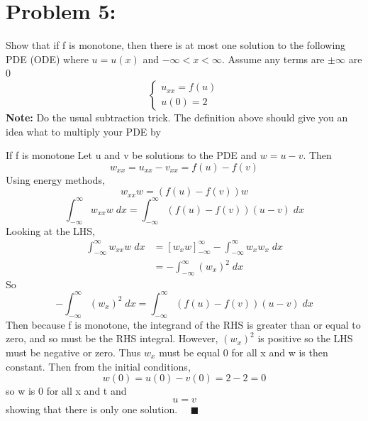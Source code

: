 \documentclass[12pt]{article}
\begin{document}
\section*{Problem 5:}

Show that if f is monotone, then there is at most one solution to the following PDE (ODE) where $u = u(x)$ and
$-\infty < x < \infty$. Assume any terms are $\pm \infty$ are 0
\[\begin{cases}
    u_{xx} = f(u)\\
    u(0) = 2
\end{cases}\]
\textbf{Note:} Do the usual subtraction trick. The definition above should give you an idea what to multiply your PDE by

\color{blue}
If f is monotone
Let u and v be solutions to the PDE and $w = u - v$. 
Then 
\[w_{xx} = u_{xx} - v_{xx} = f(u) - f(v)\]
Using energy methods,
\[w_{xx}w = (f(u) - f(v))w\]
\[\int_{-\infty}^{\infty} w_{xx}w \;dx= \int_{-\infty}^{\infty}(f(u) - f(v))(u - v)\; dx\] 
Looking at the LHS,
\begin{align*}
    \int_{-\infty}^{\infty} w_{xx}w \;dx &= \left[w_xw\right]_{-\infty}^\infty -\int_{-\infty}^{\infty} w_xw_x \; dx\\
    &= -\int_{-\infty}^{\infty} (w_x)^2\; dx
\end{align*}
So 
\[-\int_{-\infty}^{\infty} (w_x)^2\; dx = \int_{-\infty}^{\infty} (f(u) - f(v))(u - v)\; dx \]
Then because f is monotone, the integrand of the RHS is greater than or equal to zero, and so must be the RHS integral. However, $(w_x)^2$ is positive so the LHS must be negative or zero. Thus $w_x$ must be equal 0 for all x and w is then constant. 
Then from the initial conditions,
\[w(0) = u(0) - v(0) = 2 - 2 = 0\]
so w is 0 for all x and t and 
\[u = v\]
showing that there is only one solution. $\quad \blacksquare$
\end{document}
